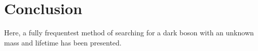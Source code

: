 \section{Conclusion}

Here, a fully frequentest method of searching for a dark boson with an unknown mass and lifetime
has been presented.




